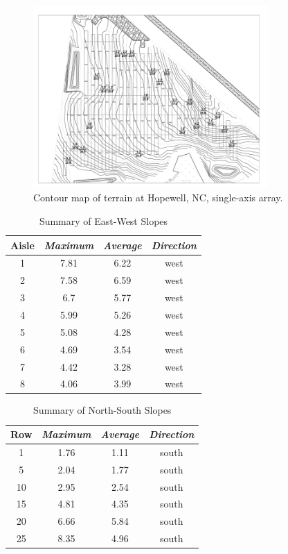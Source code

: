 \documentclass[conference]{IEEEtran}
\begin{document}
\begin{figure}[htbp]
\centerline{\includegraphics[width=9cm]{Hopewell_Civil_Base.png}}
\caption{Contour map of terrain at Hopewell, NC, single-axis array.}
\label{fig:hopewell_contour_map}
\end{figure}

\begin{table}[htbp]
\caption{Summary of East-West Slopes}
\begin{center}
\begin{tabular}{|c|c|c|c|}
\hline
\textbf{Aisle} & \textbf{\textit{Maximum}}& \textbf{\textit{Average}}& \textbf{\textit{Direction}} \\
\hline
1& 7.81& 6.22& west \\
\hline
2& 7.58& 6.59& west \\
\hline
3& 6.7& 5.77& west \\
\hline
4&5.99& 5.26& west \\
\hline
5& 5.08& 4.28& west \\
\hline
6& 4.69& 3.54& west \\
\hline
7& 4.42& 3.28& west \\
\hline
8& 4.06& 3.99& west \\
\hline
\end{tabular}
\label{table:ew-slope-summary}
\end{center}
\end{table}

\begin{table}[htbp]
\caption{Summary of North-South Slopes}
\begin{center}
\begin{tabular}{|c|c|c|c|}
\hline
\textbf{Row} & \textbf{\textit{Maximum}}& \textbf{\textit{Average}}& \textbf{\textit{Direction}} \\
\hline
1&  1.76&  1.11& south \\
\hline
5&  2.04&  1.77& south \\
\hline
10& 2.95&  2.54& south \\
\hline
15& 4.81&  4.35& south \\
\hline
20& 6.66&  5.84& south \\
\hline
25& 8.35&  4.96& south \\
\hline
\end{tabular}
\label{table:row-slope-summary}
\end{center}
\end{table}
\end{document}
